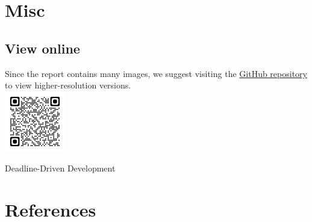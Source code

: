 \documentclass[12pt]{article}
\begin{document}


    \section{Misc}

    \subsection{View online}
    Since the report contains many images, we suggest visiting the \href{https://github.com/CSIEHaTerX/Dr.UML/}{GitHub repository} to view higher-resolution versions.\\
    \includegraphics[]{assets/repoQRCode.png}



    Deadline-Driven Development


    \section*{References}

    \nocite{Siepe2024}
    \printbibliography[heading=none]
\end{document}
